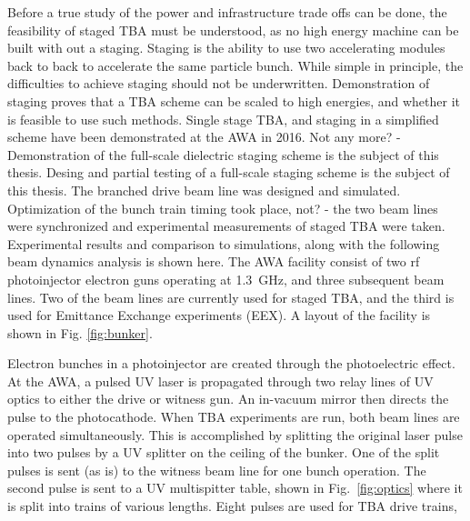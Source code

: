 \documentclass{iitthesis}
\newcommand{\lsnote}[1]{\textsf{{\color{violet}{ LS note:}   #1 }}}
\newcommand{\nrnote}[1]{\textsf{{\color{blue}{ NN note:}   #1 }}}
\begin{document}
Before a true study of the power and infrastructure trade offs 
can be done, the feasibility of staged TBA must be understood, 
as no high energy machine can be built with out a staging.
Staging is the ability to use two accelerating modules back to back to accelerate 
the same particle bunch. While simple in principle, the difficulties 
to achieve staging should not be underwritten. Demonstration of staging proves 
that a TBA scheme can be scaled to high energies, and whether it is 
feasible to use such methods. Single stage TBA, and staging 
in a simplified scheme have been demonstrated at the AWA in 2016.
\nrnote{Not any more? - Demonstration of the full-scale dielectric staging scheme is the 
	subject of this thesis.} 
Desing and partial testing of a full-scale staging scheme is the 
subject of this thesis. The branched drive beam line was designed and 
simulated. 
Optimization of the bunch train timing took place, \nrnote{not? - the two 
	beam lines were synchronized and experimental measurements 
	of staged TBA were taken. }
Experimental results and comparison to simulations, along 
with the following beam dynamics analysis is shown here.
 \label{sec:facility}
The AWA facility consist of two rf photoinjector electron guns operating
at \SI{1.3}{GHz}, and three subsequent beam lines. 
Two of the beam lines are currently used for staged TBA, and the
third is used for Emittance Exchange experiments (EEX). A layout of
the facility is shown in Fig. \ref{fig:bunker}. 

Electron bunches in a photoinjector are created through the photoelectric effect. 
At the AWA, a pulsed UV laser is propagated through two relay lines of UV optics to either
the drive or witness gun. An in-vacuum mirror then directs the pulse to the photocathode.
When TBA experiments are run, both beam lines are operated simultaneously. This is accomplished by
splitting the original laser pulse into two pulses by a UV splitter on the 
ceiling of the bunker. One of the split pulses is sent (as is) to the witness beam line for one
bunch operation. The second pulse is sent to a UV multispitter table, shown in 
Fig.~\ref{fig:optics} where it is split into trains of various lengths. Eight pulses are 
used for TBA drive trains, 
\end{document}
